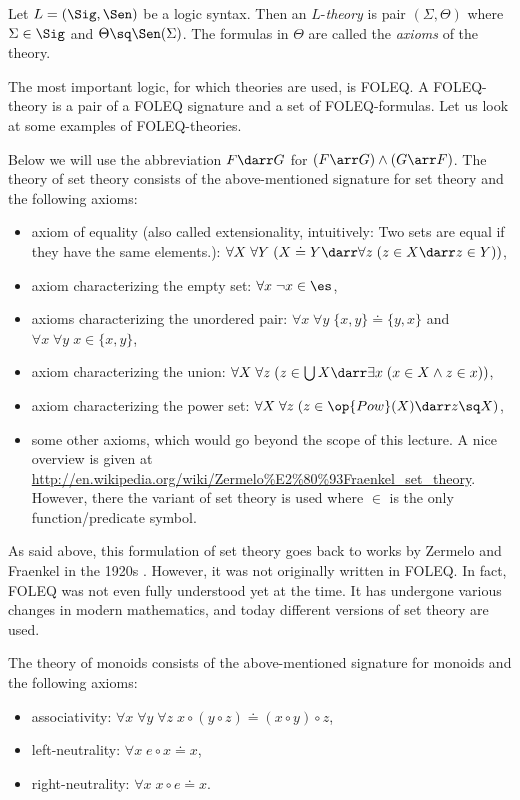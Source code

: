 \begin{definition}[Theories]
Let $L=(\Sig,\Sen)$ be a logic syntax. Then an $L$-\emph{theory} is pair $(\Sigma,\Theta)$ where $\Sigma\in\Sig$ and $\Theta\sq\Sen(\Sigma)$. The formulas in $\Theta$ are called the \emph{axioms} of the theory.
\end{definition}

The most important logic, for which theories are used, is FOLEQ. A FOLEQ-theory is a pair of a FOLEQ signature and a set of FOLEQ-formulas. Let us look at some examples of FOLEQ-theories.\medskip

\begin{example}\label{ex:set}
Below we will use the abbreviation $F\darr G$ for $(F\arr G)\wedge (G\arr F)$.
The theory of set theory consists of the above-mentioned signature for set theory and the following axioms:
\begin{itemize}
\item axiom of equality (also called extensionality, intuitively: Two sets are equal if they have the same elements.): $\forall X\;\forall Y\;(X\doteq Y \darr \forall z\;(z\in X \darr z \in Y))$,
\item axiom characterizing the empty set: $\forall x\; \neg x\in\es$,
\item axioms characterizing the unordered pair: $\forall x\;\forall y\;\{x,y\}\doteq\{y,x\}$ and $\forall x\;\forall y\;x\in\{x,y\}$,
\item axiom characterizing the union: $\forall X\;\forall z\; (z\in\bigcup X \darr \exists x\;(x \in X \wedge z\in x))$,
\item axiom characterizing the power set: $\forall X\;\forall z\; (z\in \op{Pow}(X) \darr z \sq X)$,
\item some other axioms, which would go beyond the scope of this lecture. A nice overview is given at \url{http://en.wikipedia.org/wiki/Zermelo\%E2\%80\%93Fraenkel_set_theory}. However, there the variant of set theory is used where $\in$ is the only function/predicate symbol.
\end{itemize}
As said above, this formulation of set theory goes back to works by Zermelo and Fraenkel in the 1920s \cite{zermelo,fraenkel}.
However, it was not originally written in FOLEQ.
In fact, FOLEQ was not even fully understood yet at the time.
It has undergone various changes in modern mathematics, and today different versions of set theory are used.
\end{example}

\begin{example}[Monoids]\label{ex:monoid}
The theory of monoids consists of the above-mentioned signature for monoids and the following axioms:
\begin{itemize}
\item associativity: $\forall x\;\forall y\;\forall z\;x\circ (y\circ z) \doteq (x\circ y)\circ z$,
\item left-neutrality: $\forall x\;e\circ x \doteq x$,
\item right-neutrality: $\forall x\;x\circ e \doteq x$.
\end{itemize}
\end{example}

